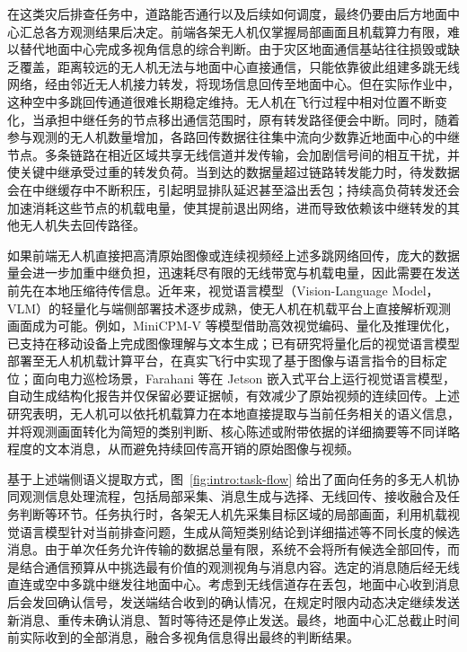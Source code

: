 在这类灾后排查任务中，道路能否通行以及后续如何调度，最终仍要由后方地面中心汇总各方观测结果后决定。前端各架无人机仅掌握局部画面且机载算力有限，难以替代地面中心完成多视角信息的综合判断。由于灾区地面通信基站往往损毁或缺乏覆盖，距离较远的无人机无法与地面中心直接通信，只能依靠彼此组建多跳无线网络，经由邻近无人机接力转发，将现场信息回传至地面中心\cite{zeng2016uav}。但在实际作业中，这种空中多跳回传通道很难长期稳定维持。无人机在飞行过程中相对位置不断变化，当承担中继任务的节点移出通信范围时，原有转发路径便会中断。同时，随着参与观测的无人机数量增加，各路回传数据往往集中流向少数靠近地面中心的中继节点。多条链路在相近区域共享无线信道并发传输，会加剧信号间的相互干扰，并使关键中继承受过重的转发负荷。当到达的数据量超过链路转发能力时，待发数据会在中继缓存中不断积压，引起明显排队延迟甚至溢出丢包；持续高负荷转发还会加速消耗这些节点的机载电量，使其提前退出网络，进而导致依赖该中继转发的其他无人机失去回传路径。

如果前端无人机直接把高清原始图像或连续视频经上述多跳网络回传，庞大的数据量会进一步加重中继负担，迅速耗尽有限的无线带宽与机载电量，因此需要在发送前先在本地压缩待传信息。近年来，视觉语言模型（Vision-Language Model，VLM）的轻量化与端侧部署技术逐步成熟，使无人机在机载平台上直接解析观测画面成为可能。例如，MiniCPM-V 等模型借助高效视觉编码、量化及推理优化，已支持在移动设备上完成图像理解与文本生成\cite{yao2025minicpmv}；已有研究将量化后的视觉语言模型部署至无人机机载计算平台，在真实飞行中实现了基于图像与语言指令的目标定位\cite{tayar2026vlnonthefly}；面向电力巡检场景，Farahani 等在 Jetson 嵌入式平台上运行视觉语言模型，自动生成结构化报告并仅保留必要证据帧，有效减少了原始视频的连续回传\cite{farahani2026evlm}。上述研究表明，无人机可以依托机载算力在本地直接提取与当前任务相关的语义信息，并将观测画面转化为简短的类别判断、核心陈述或附带依据的详细摘要等不同详略程度的文本消息，从而避免持续回传高开销的原始图像与视频。

基于上述端侧语义提取方式，图~\ref{fig:intro:task-flow} 给出了面向任务的多无人机协同观测信息处理流程\cite{zhou2024goal}，包括局部采集、消息生成与选择、无线回传、接收融合及任务判断等环节。任务执行时，各架无人机先采集目标区域的局部画面，利用机载视觉语言模型针对当前排查问题，生成从简短类别结论到详细描述等不同长度的候选消息。由于单次任务允许传输的数据总量有限，系统不会将所有候选全部回传，而是结合通信预算从中挑选最有价值的观测视角与消息内容。选定的消息随后经无线直连或空中多跳中继发往地面中心。考虑到无线信道存在丢包，地面中心收到消息后会发回确认信号，发送端结合收到的确认情况，在规定时限内动态决定继续发送新消息、重传未确认消息、暂时等待还是停止发送。最终，地面中心汇总截止时间前实际收到的全部消息，融合多视角信息得出最终的判断结果。

